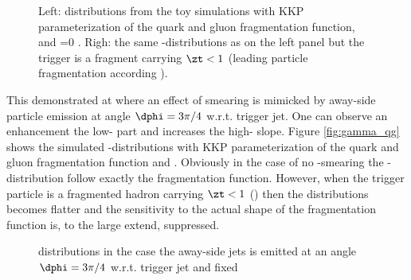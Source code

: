 \begin{figure}[htbp]
   \caption{Left: \xe{} distributions from the toy simulations with KKP parameterization  of the quark and gluon fragmentation 
   function,  and \kt{}=0 \gevc. Righ: the same \xe-distributions as on the left panel but the trigger is a fragment carrying $\zt<1$ 
   (leading particle fragmentation according ).}  
\end{figure}
This demonstrated at 
 where an effect of \kt{} smearing is mimicked by away-side particle emission at angle $\dphi = 3\pi/4$ w.r.t. trigger jet.
One can observe an enhancement the low-\xe{} part and increases the high-\xe{} slope.
Figure \ref{fig:gamma_qg} shows the simulated \xe-distributions with KKP parameterization  of the quark and gluon 
fragmentation  function and . Obviously in the case of no \kt-smearing the \xe-distribution follow exactly the fragmentation function.
However, when the trigger particle is a fragmented hadron carrying $\zt<1$ () then the \xe{} distributions becomes flatter and the sensitivity to the actual shape of the fragmentation function is, to the large extend, suppressed.


\begin{figure}[htbp]
   \centering
   \caption{\xe{} distributions in the case the away-side jets is emitted at an angle $\dphi = 3\pi/4$ w.r.t. trigger jet and fixed }  
\end{figure}


